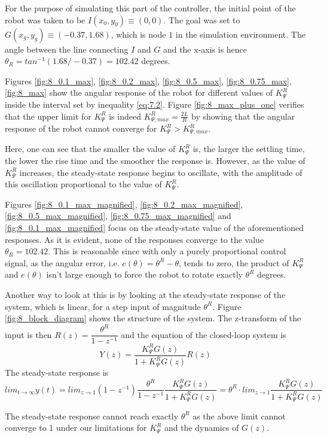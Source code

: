 For the purpose of simulating this part of the controller, the initial point of
the robot was taken to be $I (x_0, y_0) \equiv (0,0)$. The goal was set to
$G (x_g, y_g) \equiv (-0.37, 1.68)$, which is node $1$ in the simulation
environment. The angle between the line connecting $I$ and $G$ and the
x-axis is hence $\theta_R = tan^{-1}(1.68 / -0.37) = 102.42$ degrees.

Figures \ref{fig:8_0.1_max}, \ref{fig:8_0.2_max}, \ref{fig:8_0.5_max},
\ref{fig:8_0.75_max}, \ref{fig:8_max} show the angular response of the robot
for different values of $K_{\Psi}^R$ inside the interval set by inequality
\ref{eq:7.2}. Figure \ref{fig:8_max_plus_one} verifies that the upper limit
for $K_{\Psi}^R$ is indeed $K_{\Psi,max}^R = \frac{2L}{R}$ by showing that the
angular response of the robot cannot converge for $K_{\Psi}^R > K_{\Psi,max}^R$.

Here, one can see that the smaller the value of $K_{\Psi}^R$ is, the larger the
settling time, the lower the rise time and the smoother the response is. However,
as the value of $K_{\Psi}^R$ increases, the steady-state response begins to
oscillate, with the amplitude of this oscillation proportional to the value of
$K_{\Psi}^R$.

Figures \ref{fig:8_0.1_max_magnified}, \ref{fig:8_0.2_max_magnified},
\ref{fig:8_0.5_max_magnified}, \ref{fig:8_0.75_max_magnified} and
\ref{fig:8_0.1_max_magnified} focus on the steady-state value of the
aforementioned responses. As it is evident, none of the responses converge to
the value $\theta_R = 102.42$. This is reasonable since with only a purely
proportional control signal, as the angular error, i.e. $e(\theta) = \theta^R - \theta$,
tends to zero, the product of $K_{\Psi}^R$ and $e(\theta)$ isn't large enough
to force the robot to rotate exactly $\theta^R$ degrees.

Another way to look at this is by looking at the steady-state response of the
system, which is linear, for a step input of magnitude $\theta^R$. Figure
\ref{fig:8_block_diagram} shows the structure of the system. The z-transform of
the input is then $R(z) = \dfrac{\theta^R}{1 - z^{-1}}$ and the equation of the
closed-loop system is
$$Y(z) = \dfrac{K_{\Psi}^R G(z)}{1 + K_{\Psi}^R G(z)} R(z)$$
The steady-state response is
$$lim_{t \to \infty} y(t) = lim_{z \to 1} (1-z^{-1}) \dfrac{\theta^R}{1-z^{-1}}
\dfrac{K_{\Psi}^R G(z)}{1 + K_{\Psi}^R G(z)} = \theta^R \cdot lim_{z \to 1}
\dfrac{K_{\Psi}^R G(z)}{1 + K_{\Psi}^R G(z)}$$

The steady-state response cannot reach exactly $\theta^R$ as the above limit
cannot converge to 1 under our limitations for $K_{\Psi}^R$ and the dynamics of
$G(z)$.

